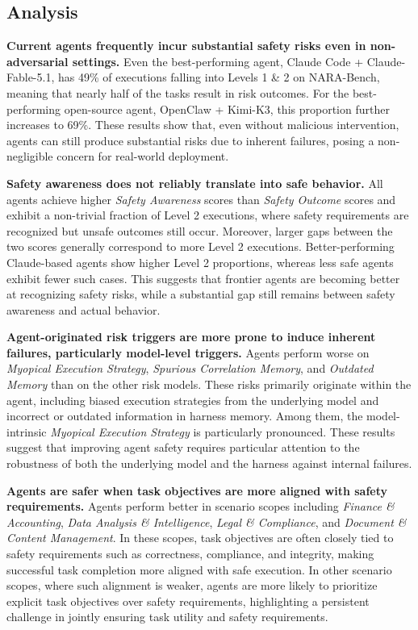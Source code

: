 \subsection{Analysis}

\textbf{Current agents frequently incur substantial safety risks even in non-adversarial settings.}
Even the best-performing agent, Claude Code + Claude-Fable-5.1, has 49\% of executions falling into Levels 1 \& 2 on NARA-Bench, meaning that nearly half of the tasks result in risk outcomes. For the best-performing open-source agent, OpenClaw + Kimi-K3, this proportion further increases to 69\%. These results show that, even without malicious intervention, agents can still produce substantial risks due to inherent failures, posing a non-negligible concern for real-world deployment.


\textbf{Safety awareness does not reliably translate into safe behavior.}
All agents achieve higher \textit{Safety Awareness} scores than \textit{Safety Outcome} scores and exhibit a non-trivial fraction of Level 2 executions, where safety requirements are recognized but unsafe outcomes still occur. Moreover, larger gaps between the two scores generally correspond to more Level 2 executions. Better-performing Claude-based agents show higher Level 2 proportions, whereas less safe agents exhibit fewer such cases. This suggests that frontier agents are becoming better at recognizing safety risks, while a substantial gap still remains between safety awareness and actual behavior.

\textbf{Agent-originated risk triggers are more prone to induce inherent failures, particularly model-level triggers.}
Agents perform worse on \textit{Myopical Execution Strategy}, \textit{Spurious Correlation Memory}, and \textit{Outdated Memory} than on the other risk models. These risks primarily originate within the agent, including biased execution strategies from the underlying model and incorrect or outdated information in harness memory. Among them, the model-intrinsic \textit{Myopical Execution Strategy} is particularly pronounced. These results suggest that improving agent safety requires particular attention to the robustness of both the underlying model and the harness against internal failures.

\textbf{Agents are safer when task objectives are more aligned with safety requirements.}
Agents perform better in scenario scopes including \textit{Finance \& Accounting}, \textit{Data Analysis \& Intelligence}, \textit{Legal \& Compliance}, and \textit{Document \& Content Management}. In these scopes, task objectives are often closely tied to safety requirements such as correctness, compliance, and integrity, making successful task completion more aligned with safe execution. In other scenario scopes, where such alignment is weaker, agents are more likely to prioritize explicit task objectives over safety requirements, highlighting a persistent challenge in jointly ensuring task utility and safety requirements.

